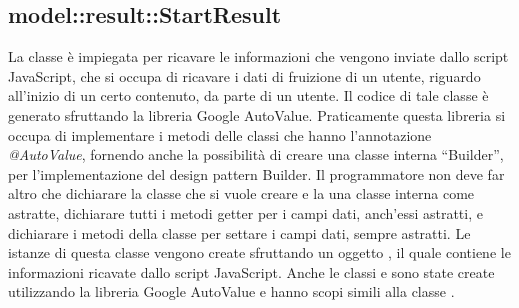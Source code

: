 \documentclass[../Tesi.tex]{subfiles}
\begin{document}
		\subsection{model::result::StartResult}
		La classe  è impiegata per ricavare le informazioni che vengono inviate dallo script JavaScript, che si occupa di ricavare i dati di fruizione di un utente, riguardo all'inizio di un certo contenuto, da parte di un utente. Il codice di tale classe è generato sfruttando la libreria Google AutoValue. Praticamente questa libreria si occupa di implementare i metodi delle classi che hanno l'annotazione \textit{@AutoValue}, fornendo anche la possibilità di creare una classe interna ``Builder'', per l'implementazione del design pattern Builder. Il programmatore non deve far altro che dichiarare la classe che si vuole creare e la una classe interna  come astratte, dichiarare tutti i metodi getter per i campi dati, anch'essi astratti, e dichiarare i metodi della classe  per settare i campi dati, sempre astratti. Le istanze di questa classe vengono create sfruttando un oggetto , il quale contiene le informazioni ricavate dallo script JavaScript. Anche le classi  e  sono state create utilizzando la libreria Google AutoValue e hanno scopi simili alla classe .
\end{document}
